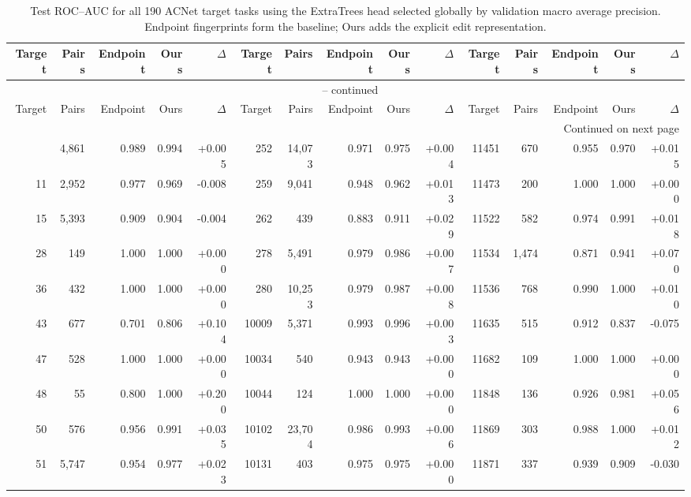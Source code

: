 \begin{longtable}{@{}rrrrr@{\hspace{1.5em}}rrrrr@{\hspace{1.5em}}rrrrr@{}}
\caption{Test ROC--AUC for all 190 ACNet target tasks using the ExtraTrees head selected globally by validation macro average precision. Endpoint fingerprints form the baseline; Ours adds the explicit edit representation.}\label{tab:acnet_all}\\
\toprule
Target & Pairs & Endpoint & Ours & $\Delta$ & Target & Pairs & Endpoint & Ours & $\Delta$ & Target & Pairs & Endpoint & Ours & $\Delta$\\
\midrule
\endfirsthead
\multicolumn{15}{c}{\tablename\ \thetable{} -- continued}\\
\toprule
Target & Pairs & Endpoint & Ours & $\Delta$ & Target & Pairs & Endpoint & Ours & $\Delta$ & Target & Pairs & Endpoint & Ours & $\Delta$\\
\midrule
\endhead
\midrule\multicolumn{15}{r}{Continued on next page}\\\endfoot
\bottomrule\endlastfoot
8 & 4,861 & 0.989 & 0.994 & +0.005 & 252 & 14,073 & 0.971 & 0.975 & +0.004 & 11451 & 670 & 0.955 & 0.970 & +0.015\\
11 & 2,952 & 0.977 & 0.969 & -0.008 & 259 & 9,041 & 0.948 & 0.962 & +0.013 & 11473 & 200 & 1.000 & 1.000 & +0.000\\
15 & 5,393 & 0.909 & 0.904 & -0.004 & 262 & 439 & 0.883 & 0.911 & +0.029 & 11522 & 582 & 0.974 & 0.991 & +0.018\\
28 & 149 & 1.000 & 1.000 & +0.000 & 278 & 5,491 & 0.979 & 0.986 & +0.007 & 11534 & 1,474 & 0.871 & 0.941 & +0.070\\
36 & 432 & 1.000 & 1.000 & +0.000 & 280 & 10,253 & 0.979 & 0.987 & +0.008 & 11536 & 768 & 0.990 & 1.000 & +0.010\\
43 & 677 & 0.701 & 0.806 & +0.104 & 10009 & 5,371 & 0.993 & 0.996 & +0.003 & 11635 & 515 & 0.912 & 0.837 & -0.075\\
47 & 528 & 1.000 & 1.000 & +0.000 & 10034 & 540 & 0.943 & 0.943 & +0.000 & 11682 & 109 & 1.000 & 1.000 & +0.000\\
48 & 55 & 0.800 & 1.000 & +0.200 & 10044 & 124 & 1.000 & 1.000 & +0.000 & 11848 & 136 & 0.926 & 0.981 & +0.056\\
50 & 576 & 0.956 & 0.991 & +0.035 & 10102 & 23,704 & 0.986 & 0.993 & +0.006 & 11869 & 303 & 0.988 & 1.000 & +0.012\\
51 & 5,747 & 0.954 & 0.977 & +0.023 & 10131 & 403 & 0.975 & 0.975 & +0.000 & 11871 & 337 & 0.939 & 0.909 & -0.030\\

\end{longtable}
